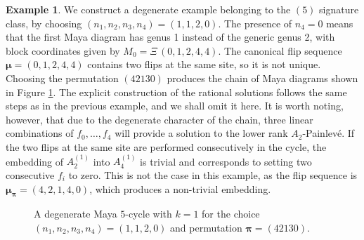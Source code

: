 \documentclass[10pt]{amsart}
\theoremstyle{definition}
\newtheorem{example}[thm]{Example}
\numberwithin{equation}{section}
\numberwithin{figure}{section}
\newcommand{\bmu}{{\boldsymbol{\mu}}}
\newcommand{\bpi}{{\boldsymbol{\pi}}}
\newcommand{\p}{Painlev\'{e}}
\begin{document}
\begin{example}
 We construct a degenerate example belonging to the $(5)$ signature class, by choosing 
 $(n_1,n_2,n_3,n_4)=(1,1,2,0)$. The presence of $n_4=0$ means that the first Maya diagram has genus 1 instead of the generic genus 2, with block coordinates given by $M_0=\Xi\,(0,1,2,4,4)$. The canonical flip sequence  $\bmu=(0,1,2,4,4)$ contains two flips at the same site, so it is not unique. Choosing the permutation $(42130)$ produces the chain of Maya  diagrams shown in Figure \ref{fig:51cyclicdegen}.  The explicit construction of the rational solutions follows the same steps as in the previous example, and we shall omit it here. It is worth noting, however, that due to the degenerate character of the chain, three linear combinations of $f_0,\dots,f_4$ will provide a solution to the lower rank $A_2$-\p. If the two flips at the same site are performed consecutively in the cycle, the embedding of $A_2^{(1)}$ into $A_4^{(1)}$ is trivial and corresponds to setting two consecutive $f_i$ to zero. This is not the case in this example, as the flip sequence is $\bmu_\bpi=(4,2,1,4,0)$, which produces a non-trivial embedding.
\begin{figure}[ht]
  \centering
{}
  
  \caption{A degenerate  Maya $5$-cycle with $k=1$ for the choice  $(n_1,n_2,n_3,n_4)=(1,1,2,0)$ and permutation $\bpi=(42130)$.}
  \label{fig:51cyclicdegen}
\end{figure}
\end{example}
\end{document}

